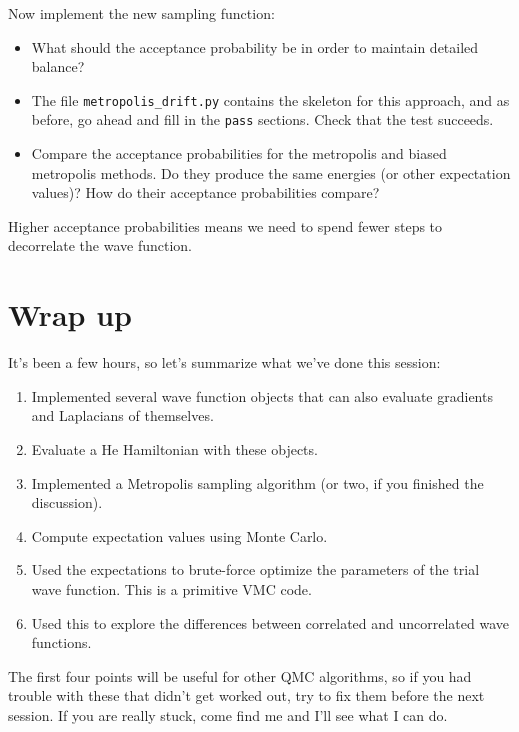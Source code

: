 \documentclass[12pt]{article}
\begin{document}
Now implement the new sampling function:
\begin{itemize}
  \item
    What should the acceptance probability be in order to maintain detailed balance?
  \item
    The file \verb|metropolis_drift.py| contains the skeleton for this approach, and as before, go ahead and fill in the \verb|pass| sections. Check that the test succeeds.
  \item
    Compare the acceptance probabilities for the metropolis and biased metropolis methods. 
    Do they produce the same energies (or other expectation values)? 
    How do their acceptance probabilities compare?
\end{itemize}

Higher acceptance probabilities means we need to spend fewer steps to decorrelate the wave function.

\section{Wrap up}

It's been a few hours, so let's summarize what we've done this session:
\begin{enumerate}
  \item
    Implemented several wave function objects that can also evaluate gradients and Laplacians of themselves.
  \item
    Evaluate a He Hamiltonian with these objects.
  \item
    Implemented a Metropolis sampling algorithm (or two, if you finished the discussion).
  \item
    Compute expectation values using Monte Carlo.
  \item
    Used the expectations to brute-force optimize the parameters of the trial wave function. 
    This is a primitive VMC code.
  \item
    Used this to explore the differences between correlated and uncorrelated wave functions.
\end{enumerate}
The first four points will be useful for other QMC algorithms, so if you had trouble with these that didn't get worked out, try to fix them before the next session.
If you are really stuck, come find me and I'll see what I can do.
\end{document}
